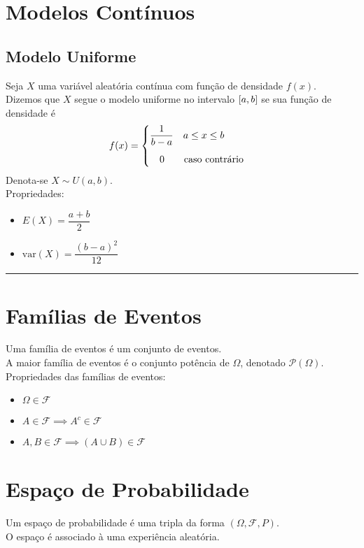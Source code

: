 \documentclass{article}
\begin{document}
\section{Modelos Contínuos}

\subsection{Modelo Uniforme}
Seja $X$ uma variável aleatória contínua com função de densidade $f(x)$. \\
Dizemos que $X$ segue o modelo uniforme no intervalo $[a,b\hspace{0.1pt}]$ se sua função de densidade é
\[
  f(x) = \begin{cases}
          \dfrac{1}{b - a} \quad a \leq x \leq b \\[10pt]
          \quad 0 \qquad \text{caso contrário}
         \end{cases} \\[10pt]
\]
Denota-se $X \sim U(a, b)$. \\[10pt]
Propriedades:
\begin{itemize}
  \item $E(X) = \dfrac{a + b}{2}$
  \item $\text{var}(X) = \dfrac{{(b - a)}^2}{12}$
\end{itemize}

\vspace{10pt}\hrule

\section{Famílias de Eventos}
Uma família de eventos é um conjunto de eventos. \\
A maior família de eventos é o conjunto potência de $\Omega$, denotado $\mathcal{P}(\Omega)$. \\[5pt]
Propriedades das famílias de eventos:
\begin{itemize}
  \item $\Omega \in \mathcal{F}$
  \item $A \in \mathcal{F} \implies A^c \in \mathcal{F}$
  \item $A, B \in \mathcal{F} \implies (A \cup B) \in \mathcal{F}$
\end{itemize}



\section{Espaço de Probabilidade}
Um espaço de probabilidade é uma tripla da forma $(\Omega, \mathcal{F}, P)$. \\
O espaço é associado à uma experiência aleatória.
\end{document}
